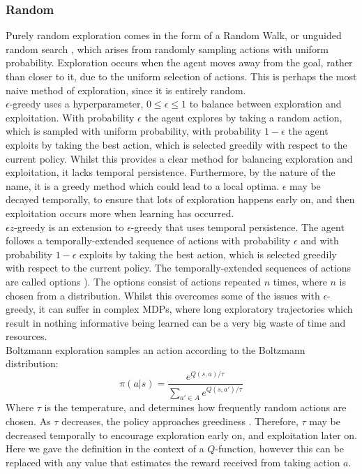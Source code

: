 \subsubsection{Random}
Purely random exploration comes in the form of a Random Walk, or unguided random search \cite{anderson86}, which arises from randomly sampling actions with uniform probability. Exploration occurs when the agent moves away from the goal, rather than closer to it, due to the uniform selection of actions. This is perhaps the most naive method of exploration, since it is entirely random.
\\$\epsilon$-greedy \cite{Watkins:1989, conf/nips/Sutton95} uses a hyperparameter, $0 \le \epsilon \le 1$ to balance between exploration and exploitation. With probability $\epsilon$ the agent explores by taking a random action, which is sampled with uniform probability, with probability $1-\epsilon$ the agent exploits by taking the best action, which is selected greedily with respect to the current policy. Whilst this provides a clear method for balancing exploration and exploitation, it lacks temporal persistence. Furthermore, by the nature of the name, it is a greedy method which could lead to a local optima. $\epsilon$ may be decayed temporally, to ensure that lots of exploration happens early on, and then exploitation occurs more when learning has occurred.
\\$\epsilon z$-greedy \cite{dabney2021temporallyextended} is an extension to $\epsilon$-greedy that uses temporal persistence. The agent follows a temporally-extended sequence of actions with probability $\epsilon$ and with probability $1-\epsilon$ exploits by taking the best action, which is selected greedily with respect to the current policy. The temporally-extended sequences of actions are called options \cite{SUTTON1999181}). The options consist of actions repeated $n$ times, where $n$ is chosen from a distribution. Whilst this overcomes some of the issues with $\epsilon$-greedy, it can suffer in complex MDPs, where long exploratory trajectories which result in nothing informative being learned can be a very big waste of time and resources.
\\ Boltzmann exploration samples an action according to the Boltzmann distribution:
\begin{equation}
\label{eqn:boltzmann}
\pi(a|s) = \frac{e^{Q(s,a)/\tau}}{\sum_{a' \in A}e^{Q(s,a')/\tau}}
\end{equation}
Where $\tau$ is the temperature, and determines how frequently random actions are chosen. As $\tau$ decreases, the policy approaches greediness \cite{DBLP:journals/corr/cs-AI-9605103, DBLP:journals/corr/abs-2109-00157}. Therefore, $\tau$ may be decreased temporally to encourage exploration early on, and exploitation later on. Here we gave the definition in the context of a $Q$-function, however this can be replaced with any value that estimates the reward received from taking action $a$.
